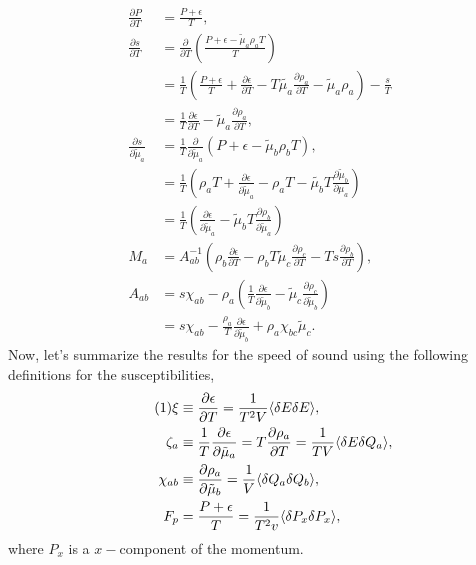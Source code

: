 \documentclass[12pt]{article}
\numberwithin{equation}{section}
\numberwithin{figure}{section}
\newcommand\eqnumber{\addtocounter{equation}{1}\tag{\theequation}}
\begin{document}
\begin{align*}
\frac{\partial P}{\partial T}&=\frac{P+\epsilon}{T},\\
\frac{\partial s}{\partial T}&=\frac{\partial}{\partial T}\left(\frac{P+\epsilon-\tilde\mu_a\rho_aT}{T}\right)\\
&=\frac{1}{T}\left(\frac{P+\epsilon}{T}+\frac{\partial\epsilon}{\partial T}-T\tilde{\mu_a}\frac{\partial\rho_a}{\partial T}-\tilde{\mu}_a\rho_a\right)-\frac{s}{T}\\
&=\frac{1}{T}\frac{\partial\epsilon}{\partial T}-\tilde{\mu}_a\frac{\partial\rho_a}{\partial T},\\
\frac{\partial s}{\partial\tilde{\mu}_a}&=\frac{1}{T}\frac{\partial}{\partial\tilde{\mu}_a}(P+\epsilon-\tilde{\mu}_b\rho_bT),\\
&=\frac{1}{T}\left(
\rho_aT+\frac{\partial\epsilon}{\partial\tilde{\mu}_a}-\rho_aT-\tilde{\mu_b}T\frac{\partial\tilde{\mu}_b}{\partial\mu_a}
\right)\\
&=\frac{1}{T}\left(
\frac{\partial\epsilon}{\partial\tilde{\mu}_a}-\tilde{\mu}_bT\frac{\partial\rho_b}{\partial\tilde{\mu}_a}
\right)\\
M_a&=A^{-1}_{ab}\left(
\rho_b \frac{\partial\epsilon}{\partial T}  -\rho_bT\tilde{\mu}_c\frac{\partial\rho_c}{\partial T}-Ts\frac{\partial\rho_b}{\partial T}\right),\\
A_{ab}&=s\chi_{ab}-\rho_a\left(
\frac{1}{T}\frac{\partial\epsilon}{\partial\tilde{\mu}_b}-\tilde{\mu}_c\frac{\partial\rho_c}{\partial\tilde{\mu}_b}
\right)\\
&=s\chi_{ab}-\frac{\rho_a}{T}\frac{\partial\epsilon}{\partial\tilde{\mu}_b}+\rho_a\chi_{bc}\tilde{\mu}_c.
\end{align*}
Now, let's summarize the results for the speed of sound using the following definitions for the susceptibilities,
\begin{align*}\eqnumber
\xi&\equiv \frac{\partial\epsilon}{\partial T}=\frac{1}{T^2V}\langle\delta E\delta E\rangle,\\
\zeta_a&\equiv\frac{1}{T}\frac{\partial\epsilon}{\partial\tilde{\mu}_a}=T\frac{\partial\rho_a}{\partial T}
=\frac{1}{TV}\langle\delta E\delta Q_a\rangle,\\
\chi_{ab}&\equiv\frac{\partial\rho_a}{\partial\tilde{\mu}_b}=\frac{1}{V}\langle\delta Q_a\delta Q_b\rangle,\\
F_p&=\frac{P+\epsilon}{T}=\frac{1}{T^2v}\langle\delta P_x\delta P_x\rangle,
\end{align*}
where $P_x$ is a $x-$component of the momentum.
\end{document}
